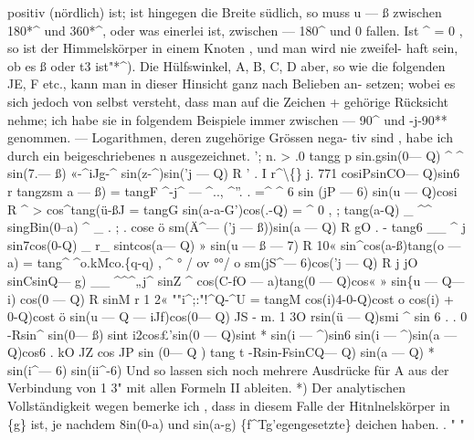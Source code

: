 \documentclass[12pt,a4paper]{article}
\begin{document}
positiv  (nördlich)  ist;  ist  hingegen  die  Breite  südlich,  so  muss  u  ---  ß  zwischen
180*\^{}  und  360*\^{},  oder  was  einerlei  ist,  zwischen  --- 180\^{}  und  0  fallen.  Ist
\^{}  =  0  ,  so  ist  der  Himmelskörper  in  einem  Knoten ,  und  man  wird  nie  zweifel-
haft sein,  ob  es  ß  oder  t3  ist"*\^{}).  Die  Hülfswinkel,  A,  B,  C,  D  aber,  so  wie
die  folgenden  JE,  F  etc.,  kann  man  in  dieser  Hinsicht  ganz  nach  Belieben  an-
setzen; wobei  es  sich  jedoch  von  selbst  versteht,  dass  man  auf  die  Zeichen  +
gehörige  Rücksicht  nehme;  ich  habe  sie  in  folgendem  Beispiele  immer  zwischen
---  90\^{}  und  -j-90**  genommen.  ---  Logarithmen,  deren  zugehörige  Grössen  nega-
tiv sind ,  habe  ich  durch  ein  beigeschriebenes  n  ausgezeichnet.
';            n.  >
.0  tangg          p  sin.gsin(0--- Q)         \^{}
\^{}  sin(7.--- ß)  «-\^{}iJg-\^{}  sin(z-\^{})sin('j  --- Q)  R
'     .           I  r\^{}\textbackslash\{\}  j.  771                cosiPsinCO--- Q)sin6  r
tangzsm  a  --- ß)  =  tangF  \^{}-j\^{} --- \^{}..,  \^{}''.   .  =\^{}  \^{}
6
sin  (jP --- 6)  sin(u --- Q)cosi  R
\^{}                  >            cos\^{}tang(ü-ßJ  =  tangG  sin(a-a-G')cos(.-Q)  =  \^{}
0  ,  ;  tang(a-Q)  \_  \^{}\^{}  singBin(0--a)   \^{}
\_   .
;     .                                                         cose                         ö  sm(Ä\^{}--- ('j  --- ß))sin(a  --- Q)          R
gO     .      -                                            tang6           \_\_  \^{}          j  sin7cos(0-Q)  \_    r\_
sintcos(a--- Q)                  »  sin(u  --- ß  --- 7)            R
10«       sin\^{}cos(a-ß)tang(o  --- a)  =  tang\^{}  \^{}o.kMco.\{q-q)        ,
\^{}           °  /          ov          °°/                  o  sm(jS\^{}--- 6)cos('j  --- Q)          R
j  jO    sinCsinQ--- g)  \_\_  \^{}\^{}\^{}„j\^{}    sinZ    \^{}
cos(C-fO  --- a)tang(0  --- Q)cos«                  »  sin\{u  --- Q--- i)  cos(0  --- Q)          R
sinM  r
1 2«    ""i\^{};:"!\^{}Q-\^{}U  =  tangM
cos(i)4-0-Q)cost  o
cos(i)  +  0-Q)cost  ö  sin(u  --- Q  --- iJf)cos(0--- Q)  JS
-            m.
1  3O  rsin(ü  --- Q)smi     \^{}
sin  6
.  . 0  -Rsin\^{}  sin(0--- ß)  sint        i2cos£'sin(0 --- Q)sint          *
sin(i  ---  \^{})sin6  sin(i  ---  \^{})sin(a  ---  Q)cos6
.  kO  JZ cos  JP  sin (0---  Q )  tang t     -Rsin-FsinCQ--- Q)  sin(a  --- Q)       *
sin(i\^{}--- 6)  sin(ii\^{}-6)
Und  so  lassen  sich  noch  mehrere  Ausdrücke  für    A    aus  der  Verbindung
von   1 3"  mit  allen  Formeln  II  ableiten.
*)  Der  analytischen  Vollständigkeit  wegen  bemerke  ich ,  dass  in  diesem  Falle  der  Hitnlnelskörper  in
\{g\}
ist,  je  nachdem   8in(0-a)  und  sin(a-g)  \{f\^{}Tg'egengesetzte\}  deichen  haben.  .       "
"
\end{document}

